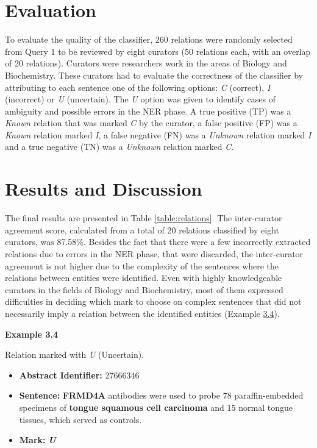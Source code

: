 \section{Evaluation}

To evaluate the quality of the classifier, 260 relations were randomly selected from Query 1 to be reviewed by eight curators (50 relations each, with an overlap of 20 relations). Curators were researchers work in the areas of Biology and Biochemistry. These curators had to evaluate the correctness of the classifier by attributing to each sentence one of the following options: \textit{C} (correct), \textit{I} (incorrect) or \textit{U} (uncertain). The \textit{U} option was given to identify cases of ambiguity and possible errors in the NER phase. A true positive (TP) was a \textit{Known} relation that was marked \textit{C} by the curator, a false positive (FP) was a \textit{Known} relation marked \textit{I}, a false negative (FN) was a \textit{Unknown} relation marked \textit{I} and a true negative (TN) was a \textit{Unknown} relation marked \textit{C}.


\section{Results and Discussion}

The final results are presented in Table \ref{table:relations}. The inter-curator agreement score, calculated from a total of 20 relations classified by eight curators, was 87.58\%. Besides the fact that there were a few incorrectly extracted relations due to errors in the NER phase, that were discarded, the inter-curator agreement is not higher due to the complexity of the sentences where the relations between entities were identified. Even with highly knowledgeable curators in the fields of Biology and Biochemistry, most of them expressed difficulties in deciding which mark to choose on complex sentences that did not necessarily imply a relation between the identified entities (Example \hyperlink{ex3.4}{3.4}). 

\bigskip


\hypertarget{ex3.4}{\textbf{Example 3.4}} Relation marked with \textit{U} (Uncertain).
\begin{itemize}
\item\textbf{Abstract Identifier:} 27666346
\item\textbf{Sentence:} \textbf{FRMD4A} antibodies were used to probe 78 paraffin-embedded specimens of \textbf{tongue squamous cell carcinoma} and 15 normal tongue tissues, which served as controls.
\item\textbf{Mark:} \textbf{\textit{U}}
\end{itemize}

